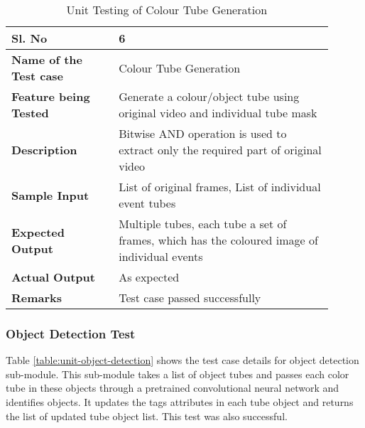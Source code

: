         \FloatBarrier
        \begin{table}[H]
            \begin{tabular}{|p{0.3\linewidth}|p{0.6\linewidth}|}
                \hline
                \textbf{Sl. No }              &\textbf{ 6}\\
                \hline
                \textbf{Name of the Test case}  & Colour Tube Generation \\
                \hline
                \textbf{Feature being Tested}  & Generate a colour/object tube using original video and individual tube mask \\
                \hline
                \textbf{Description}           & Bitwise AND operation is used to extract only the required part of original video \\
                \hline
                \textbf{Sample Input}          & List of original frames, List of individual event tubes \\
                \hline
                \textbf{Expected Output}       & Multiple tubes, each tube a set of frames, which has the coloured image of individual events \\
                \hline
                \textbf{Actual Output}         & As expected \\
                \hline
                \textbf{Remarks }              & Test case passed successfully \\
                \hline
            \end{tabular}
            \caption{Unit Testing of Colour Tube Generation}
            \label{table:unit-colour-tube-generation}
        \end{table}


        \subsubsection{Object Detection Test}

        Table \ref{table:unit-object-detection} shows the test case details for object detection sub-module. This sub-module takes a list of object tubes and passes each color tube in these objects through a pretrained convolutional neural network and identifies objects. It updates the tags attributes in each tube object and returns the list of updated tube object list. This test was also successful.

